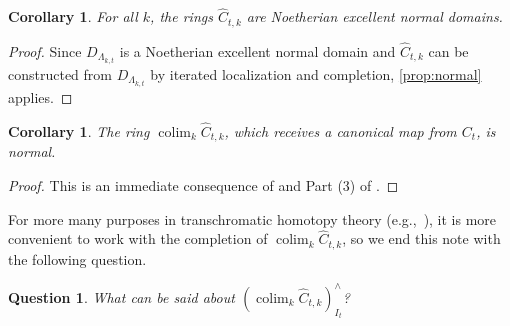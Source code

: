 \documentclass[oneside]{amsart}
\def\biblio{}
\newtheorem{cor}[thm]{Corollary}
\newtheorem{quest}[thm]{Question}
\theoremstyle{definition}
\theoremstyle{remark}
\theoremstyle{theorem}
\numberwithin{equation}{section}
\DeclareMathOperator{\colim}{colim}
\newcommand{\lkt}{\Lambda_{k,t}}
\begin{document}
\begin{cor}\label{cor:ctk}
For all $k$, the rings $\hat{C}_{t,k}$ are Noetherian excellent normal domains. 
\end{cor}
\begin{proof}
Since $D_{\lkt}$ is a Noetherian excellent normal domain and $\hat{C}_{t,k}$ can be constructed from $D_{\lkt}$  by iterated localization and completion, \cref{prop:normal} applies. 
\end{proof}


\begin{cor}\label{cor:ct}
The ring $\colim_k \hat{C}_{t,k}$, which receives a canonical map from $C_t$, is normal.
\end{cor}
\begin{proof}
This is an immediate consequence of  and Part (3) of . 
\end{proof}

For more many purposes in transchromatic homotopy theory (e.g.,~\cite{bs_centralizers}), it is more convenient to work with the completion of $\colim_k \hat{C}_{t,k}$, so we end this note with the following question.

\begin{quest}
What can be said about $(\colim_k \hat{C}_{t,k})^{\wedge}_{I_t}$?
\end{quest}

\biblio

\end{document}
